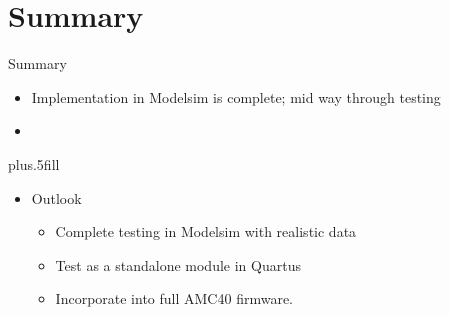 \documentclass{beamer}
\begin{document}
\section*{Summary}

\begin{frame}{Summary}

  \begin{itemize}
  \item
    Implementation in Modelsim is complete; mid way through testing
  \item

  \end{itemize}

  \vskip0pt plus.5fill
  \begin{itemize}
  \item
    Outlook
    \begin{itemize}
    \item
      Complete testing in Modelsim with realistic data
    \item
      Test as a standalone module in Quartus
    \item
      Incorporate into full AMC40 firmware.
    \end{itemize}
  \end{itemize}
\end{frame}
\end{document}
